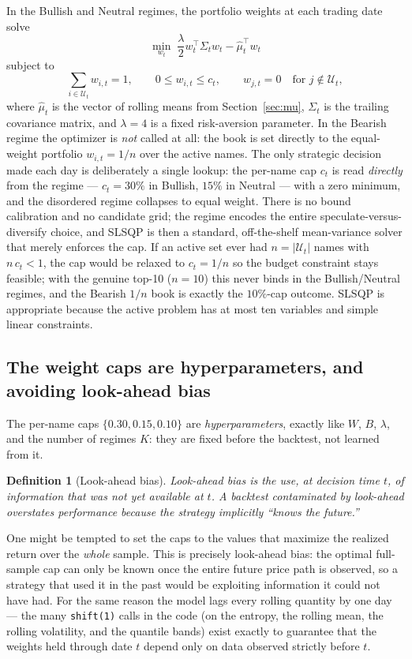 \documentclass[a4paper,12pt]{article}
\newtheorem{definition}{Definition}[section]
\begin{document}
In the Bullish and Neutral regimes, the portfolio weights at each trading date solve
\[
\min_{w_t}\;\frac{\lambda}{2}w_t^\top \Sigma_t w_t-\widehat{\mu}_t^\top w_t
\]
subject to
\[
\sum_{i\in\mathcal{U}_t}w_{i,t}=1,\qquad
0\leq w_{i,t}\leq c_t,\qquad
w_{j,t}=0\quad\text{for }j\notin\mathcal{U}_t,
\]
where $\widehat\mu_t$ is the vector of rolling means from Section~\ref{sec:mu}, $\Sigma_t$ is the trailing covariance matrix, and $\lambda=4$ is a fixed risk-aversion parameter. In the Bearish regime the optimizer is \emph{not} called at all: the book is set directly to the equal-weight portfolio $w_{i,t}=1/n$ over the active names. The only strategic decision made each day is deliberately a single lookup: the per-name cap $c_t$ is read \emph{directly} from the regime --- $c_t=30\%$ in Bullish, $15\%$ in Neutral --- with a zero minimum, and the disordered regime collapses to equal weight. There is no bound calibration and no candidate grid; the regime encodes the entire speculate-versus-diversify choice, and SLSQP is then a standard, off-the-shelf mean-variance solver that merely enforces the cap. If an active set ever had $n=|\mathcal{U}_t|$ names with $n\,c_t<1$, the cap would be relaxed to $c_t=1/n$ so the budget constraint stays feasible; with the genuine top-10 ($n=10$) this never binds in the Bullish/Neutral regimes, and the Bearish $1/n$ book is exactly the $10\%$-cap outcome. SLSQP is appropriate because the active problem has at most ten variables and simple linear constraints.

\subsection{The weight caps are hyperparameters, and avoiding look-ahead bias}
\label{sec:caps}

The per-name caps $\{0.30,0.15,0.10\}$ are \emph{hyperparameters}, exactly like $W$, $B$, $\lambda$, and the number of regimes $K$: they are fixed before the backtest, not learned from it.

\begin{definition}[Look-ahead bias]
\emph{Look-ahead bias} is the use, at decision time $t$, of information that was not yet available at $t$. A backtest contaminated by look-ahead overstates performance because the strategy implicitly ``knows the future.''
\end{definition}

One might be tempted to set the caps to the values that maximize the realized return over the \emph{whole} sample. This is precisely look-ahead bias: the optimal full-sample cap can only be known once the entire future price path is observed, so a strategy that used it in the past would be exploiting information it could not have had. For the same reason the model lags every rolling quantity by one day --- the many \texttt{shift(1)} calls in the code (on the entropy, the rolling mean, the rolling volatility, and the quantile bands) exist exactly to guarantee that the weights held through date $t$ depend only on data observed strictly before $t$.
\end{document}
